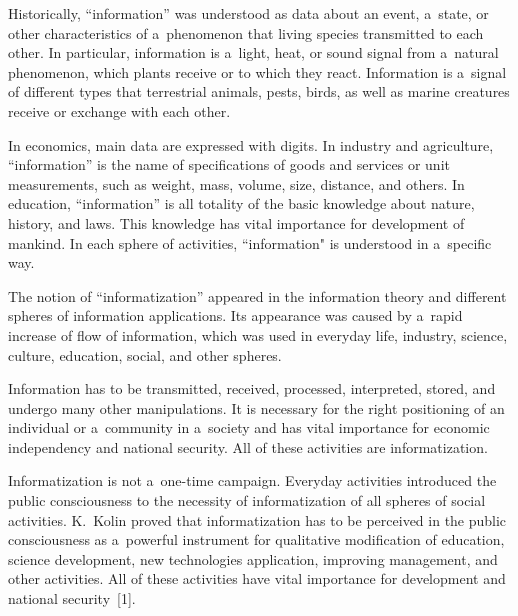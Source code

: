 




      \thispagestyle{myheadings}

      \begin{multicols}{2}

                  \label{st\stat}

\noindent
   Historically, ``information'' was understood as data about an event, a~state, or 
other characteristics of a~phenomenon that living species transmitted to each other. 
In particular, information is a~light, heat, or sound signal from a~natural 
phenomenon, which plants receive or to which they react. Information is a~signal 
of different types that terrestrial animals, pests, birds, as well as marine creatures 
receive or exchange with each other.
{

}
   
   In economics, main data are expressed with digits. In industry and agriculture, 
``information'' is the name of specifications of goods and services or unit 
measurements, such as weight, mass, volume, size, distance, and others. In 
education, ``information'' is all totality of the basic knowledge about nature, 
history, and laws. This knowledge has vital importance for development of 
mankind. In each sphere of activities, ``information" is understood in a~specific 
way.
   
   The notion of ``informatization'' appeared in the information theory and 
different spheres of information applications. Its appearance was caused by a~rapid 
increase of flow of information, which was used in everyday life, industry, science, 
culture, education, social, and other spheres.
   
   Information has to be transmitted, received, processed, interpreted, stored, and 
undergo many other manipulations. It is necessary for the right positioning of an 
individual or a~community in a~society and has vital importance for economic 
independency and national security. All of these activities are informatization.
   
   Informatization is not a~one-time campaign. Everyday activities introduced the 
public consciousness to the necessity of informatization of all spheres of social 
activities. K.~Kolin proved that informatization has to be perceived in the public 
consciousness as a~powerful instrument for qualitative modification of education, 
science development, new technologies application, improving management, and 
other activities. All of these activities have vital importance for development and 
national security~[1].
   

\end{multicols}
